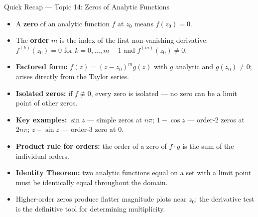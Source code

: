 \documentclass[12pt,a4paper]{article}
\begin{document}
\begin{learnbox}{Quick Recap --- Topic 14: Zeros of Analytic Functions}
\begin{itemize}
  \item A \textbf{zero} of an analytic function $f$ at $z_0$ means $f(z_0)=0$.
  \item The \textbf{order} $m$ is the index of the first non-vanishing derivative:
        $f^{(k)}(z_0)=0$ for $k=0,\ldots,m-1$ and $f^{(m)}(z_0)\neq 0$.
  \item \textbf{Factored form:} $f(z)=(z-z_0)^m g(z)$ with $g$ analytic and $g(z_0)\neq 0$;
        arises directly from the Taylor series.
  \item \textbf{Isolated zeros:} if $f\not\equiv 0$, every zero is isolated --- no zero can
        be a limit point of other zeros.
  \item \textbf{Key examples:} $\sin z$ --- simple zeros at $n\pi$; $1-\cos z$ --- order-2
        zeros at $2n\pi$; $z-\sin z$ --- order-3 zero at $0$.
  \item \textbf{Product rule for orders:} the order of a zero of $f\cdot g$ is the sum of
        the individual orders.
  \item \textbf{Identity Theorem:} two analytic functions equal on a set with a limit point
        must be identically equal throughout the domain.
  \item Higher-order zeros produce flatter magnitude plots near $z_0$; the derivative test
        is the definitive tool for determining multiplicity.
\end{itemize}
\end{learnbox}
\end{document}
